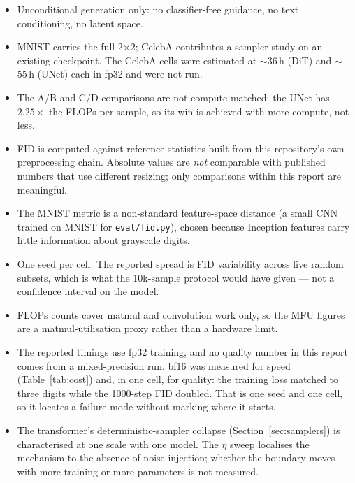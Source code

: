 \documentclass{article}
\begin{document}
\begin{itemize}
  \item Unconditional generation only: no classifier-free guidance, no text conditioning,
        no latent space.
  \item MNIST carries the full 2$\times$2; CelebA contributes a sampler study on an existing
        checkpoint. The CelebA cells were estimated at $\sim$36\,h (DiT) and $\sim$55\,h
        (UNet) each in fp32 and were not run.
  \item The A/B and C/D comparisons are not compute-matched: the UNet has $2.25\times$ the
        FLOPs per sample, so its win is achieved with more compute, not less.
  \item FID is computed against reference statistics built from this repository's own
        preprocessing chain. Absolute values are \emph{not} comparable with published
        numbers that use different resizing; only comparisons within this report are
        meaningful.
  \item The MNIST metric is a non-standard feature-space distance (a small CNN trained
        on MNIST for \texttt{eval/fid.py}), chosen because Inception features carry little
        information about grayscale digits.
  \item One seed per cell. The reported spread is FID variability across five random
        subsets, which is what the 10k-sample protocol would have given --- not a
        confidence interval on the model.
  \item FLOPs counts cover matmul and convolution work only, so the MFU figures are a
        matmul-utilisation proxy rather than a hardware limit.
  \item The reported timings use fp32 training, and no quality number in this report comes
        from a mixed-precision run. bf16 was measured for speed (Table~\ref{tab:cost}) and,
        in one cell, for quality: the training loss matched to three digits while the
        1000-step FID doubled. That is one seed and one cell, so it locates a failure mode
        without marking where it starts.
  \item The transformer's deterministic-sampler collapse (Section~\ref{sec:samplers}) is
        characterised at one scale with one model. The $\eta$ sweep localises the mechanism to
        the absence of noise injection; whether the boundary moves with more training or more
        parameters is not measured.
\end{itemize}

\end{document}
